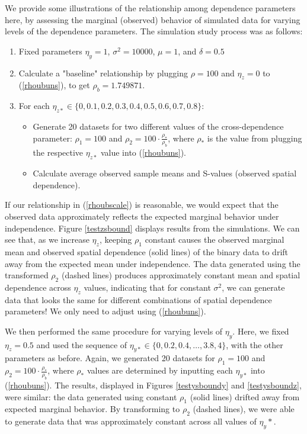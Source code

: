 \documentclass[12pt, a4paper, twoside]{article}
\begin{document}
We provide some illustrations of the relationship among dependence parameters here, by assessing the marginal (observed) behavior of simulated data for varying levels of the dependence parameters. The simulation study process was as follows:
\begin{enumerate}
	\item Fixed parameters $\eta_y = 1$, $\sigma^2=10000$, $\mu=1$, and $\delta=0.5$
	\item Calculate a "baseline" relationship by plugging $\rho=100$ and $\eta_z = 0$ to (\ref{rhoubuns}), to get $\rho_b=1.749871$.
	\item For each $\eta_{z*} \in \lbrace 0, 0.1, 0.2, 0.3, 0.4, 0.5, 0.6, 0.7, 0.8 \rbrace$:
	\begin{itemize}
		\item Generate 20 datasets for two different values of the cross-dependence parameter: $\rho_1 = 100$ and $\rho_2 = 100\cdot\frac{\rho_*}{\rho_b}$, where $\rho_*$ is the value from plugging the respective $\eta_{z*}$ value into (\ref{rhoubuns}).
		\item Calculate average observed sample means and S-values (observed spatial dependence).
	\end{itemize}
\end{enumerate} 
If our relationship in (\ref{rhoubscale}) is reasonable, we would expect that the observed data approximately reflects the expected marginal behavior under independence. Figure \ref{testzsbound} displays results from the simulations. We can see that, as we increase $\eta_z$, keeping $\rho_1$ constant causes the observed marginal mean and observed spatial dependence (solid lines) of the binary data to drift away from the expected mean under independence. The data generated using the transformed $\rho_2$ (dashed lines) produces approximately constant mean and spatial dependence across $\eta_z$ values, indicating that for constant $\sigma^2$, we can generate data that looks the same for different combinations of spatial dependence parameters! We only need to adjust using (\ref{rhoubuns}).

We then performed the same procedure for varying levels of $\eta_{y}$. Here, we fixed $\eta_z=0.5$ and used the sequence of $\eta_{y*} \in \lbrace 0, 0.2, 0.4,\dots,3.8,4\rbrace$, with the other parameters as before. Again, we generated 20 datasets for $\rho_1=100$ and $\rho_2=100\cdot\frac{\rho_*}{\rho_b} $, where $\rho_*$ values are determined by inputting each $\eta_{y*}$ into (\ref{rhoubuns}). The results, displayed in Figures \ref{testysboundy} and \ref{testysboundz}, were similar: the data generated using constant $\rho_1$ (solid lines) drifted away from expected marginal behavior. By transforming to $\rho_2$ (dashed lines), we were able to generate data that was approximately constant across all values of $\eta_y*$.
\end{document}
